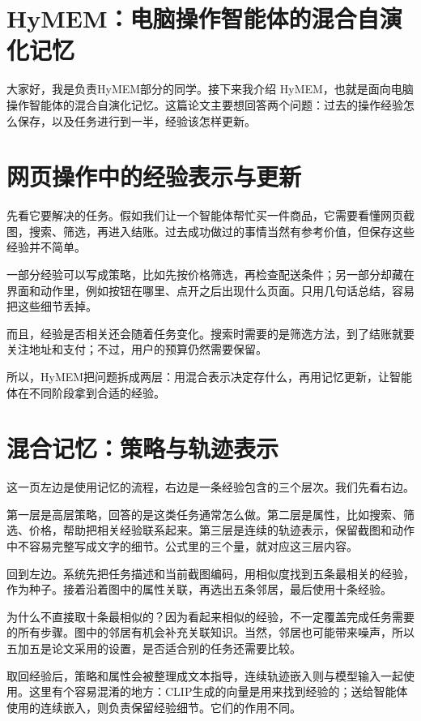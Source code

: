 \documentclass[UTF8,fontset=fandol]{ctexart}
\providecommand{\speakername}{负责HyMEM部分的同学}
\begin{document}
\section*{HyMEM：电脑操作智能体的混合自演化记忆}
大家好，我是\speakername{}。接下来我介绍 HyMEM，也就是面向电脑操作智能体的混合自演化记忆。这篇论文主要想回答两个问题：过去的操作经验怎么保存，以及任务进行到一半，经验该怎样更新。
\clearpage
{}
\section*{网页操作中的经验表示与更新}
先看它要解决的任务。假如我们让一个智能体帮忙买一件商品，它需要看懂网页截图，搜索、筛选，再进入结账。过去成功做过的事情当然有参考价值，但保存这些经验并不简单。

一部分经验可以写成策略，比如先按价格筛选，再检查配送条件；另一部分却藏在界面和动作里，例如按钮在哪里、点开之后出现什么页面。只用几句话总结，容易把这些细节丢掉。

而且，经验是否相关还会随着任务变化。搜索时需要的是筛选方法，到了结账就要关注地址和支付；不过，用户的预算仍然需要保留。

所以，HyMEM把问题拆成两层：用混合表示决定存什么，再用记忆更新，让智能体在不同阶段拿到合适的经验。
\clearpage
{}
\section*{混合记忆：策略与轨迹表示}
这一页左边是使用记忆的流程，右边是一条经验包含的三个层次。我们先看右边。

第一层是高层策略，回答的是这类任务通常怎么做。第二层是属性，比如搜索、筛选、价格，帮助把相关经验联系起来。第三层是连续的轨迹表示，保留截图和动作中不容易完整写成文字的细节。公式里的三个量，就对应这三层内容。

回到左边。系统先把任务描述和当前截图编码，用相似度找到五条最相关的经验，作为种子。接着沿着图中的属性关联，再选出五条邻居，最后使用十条经验。

为什么不直接取十条最相似的？因为看起来相似的经验，不一定覆盖完成任务需要的所有步骤。图中的邻居有机会补充关联知识。当然，邻居也可能带来噪声，所以五加五是论文采用的设置，是否适合别的任务还需要比较。

取回经验后，策略和属性会被整理成文本指导，连续轨迹嵌入则与模型输入一起使用。这里有个容易混淆的地方：CLIP生成的向量是用来找到经验的；送给智能体使用的连续嵌入，则负责保留经验细节。它们的作用不同。
\clearpage
{}
\end{document}

